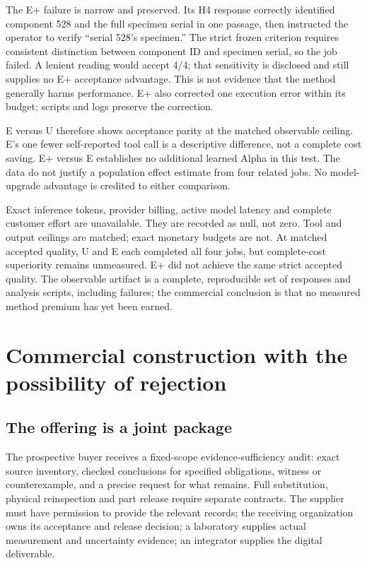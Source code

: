 \documentclass[
  11pt,
]{article}
\let\OriginalSection\section
\renewcommand{\section}{\needspace{5\baselineskip}\OriginalSection}
\let\OriginalSubsection\subsection
\renewcommand{\subsection}{\needspace{6\baselineskip}\OriginalSubsection}
\begin{document}
The E+ failure is narrow and preserved. Its H4 response correctly
identified component 528 and the full specimen serial in one passage,
then instructed the operator to verify ``serial 528's specimen.'' The
strict frozen criterion requires consistent distinction between
component ID and specimen serial, so the job failed. A lenient reading
would accept 4/4; that sensitivity is disclosed and still supplies no E+
acceptance advantage. This is not evidence that the method generally
harms performance. E+ also corrected one execution error within its
budget; scripts and logs preserve the correction.

E versus U therefore shows acceptance parity at the matched observable
ceiling. E's one fewer self-reported tool call is a descriptive
difference, not a complete cost saving. E+ versus E establishes no
additional learned Alpha in this test. The data do not justify a
population effect estimate from four related jobs. No model-upgrade
advantage is credited to either comparison.

Exact inference tokens, provider billing, active model latency and
complete customer effort are unavailable. They are recorded as null, not
zero. Tool and output ceilings are matched; exact monetary budgets are
not. At matched accepted quality, U and E each completed all four jobs,
but complete-cost superiority remains unmeasured. E+ did not achieve the
same strict accepted quality. The observable artifact is a complete,
reproducible set of responses and analysis scripts, including failures;
the commercial conclusion is that no measured method premium has yet
been earned.

\hypertarget{commercial-construction-with-the-possibility-of-rejection}{%
\section{Commercial construction with the possibility of
rejection}\label{commercial-construction-with-the-possibility-of-rejection}}

\hypertarget{the-offering-is-a-joint-package}{%
\subsection{The offering is a joint
package}\label{the-offering-is-a-joint-package}}

The prospective buyer receives a fixed-scope evidence-sufficiency audit:
exact source inventory, checked conclusions for specified obligations,
witness or counterexample, and a precise request for what remains. Full
substitution, physical reinspection and part release require separate
contracts. The supplier must have permission to provide the relevant
records; the receiving organization owns its acceptance and release
decision; a laboratory supplies actual measurement and uncertainty
evidence; an integrator supplies the digital deliverable.
\end{document}
